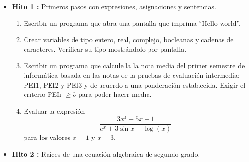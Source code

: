 \documentclass[12pt,spanish]{article}
\begin{document}
\begin{itemize}
	
	
\vspace{1cm}
\item {\bf Hito 1 :} Primeros pasos con expresiones, asignaciones y sentencias. 
\begin{enumerate} 
\item Escribir un programa  que abra una pantalla que imprima ``Hello world''. 
\item Crear variables de tipo entero, real, complejo, booleanas y
cadenas de caracteres. Verificar su tipo mostrándolo por pantalla. 
\item Escribir un programa  que calcule la la nota media del primer 
semestre de informática basada en las notas de la pruebas de evaluación intermedia: PEI1, PEI2 y PEI3
y de acuerdo a una ponderación establecida. Exigir el criterio  PEIi $ \ge 3$ para poder hacer media. 
\item Evaluar la expresión 
$$ \frac{ 3 x^3 + 5 x - 1 }{ e^x + 3 \sin x - \log(x) }
$$
para los valores $ x = 1 $ y $ x=3$.
\end{enumerate}
%
               
%  
%        
%


\vspace{1cm}
\item {\bf Hito 2 :}    Raíces de una ecuación algebraica de segundo grado. 


\end{itemize}
\end{document}
